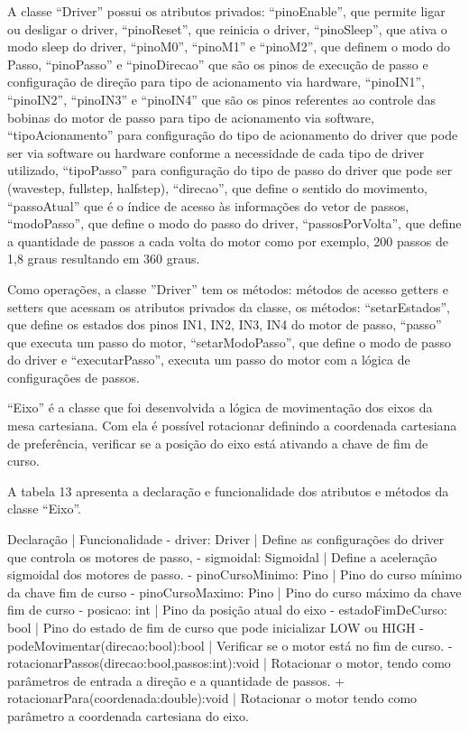 A classe “Driver” possui os atributos privados: “pinoEnable”, que permite ligar ou desligar o driver, 
“pinoReset”, que reinicia o driver, “pinoSleep”, que ativa o modo sleep do driver, “pinoM0”, “pinoM1” 
e “pinoM2”, que definem o modo do Passo, “pinoPasso” e “pinoDirecao” que são os pinos de execução de 
passo e configuração de direção para tipo de acionamento via hardware, “pinoIN1”, “pinoIN2”, “pinoIN3” 
e “pinoIN4” que são os pinos referentes ao controle das bobinas do motor de passo para tipo de acionamento 
via software, “tipoAcionamento” para configuração do tipo de acionamento do driver que pode ser via software 
ou hardware conforme a necessidade de cada tipo de driver utilizado, “tipoPasso” para configuração do tipo 
de passo do driver que pode ser (wavestep, fullstep, halfstep), “direcao”, que define o sentido do movimento, 
“passoAtual” que é o índice de acesso às informações do vetor de passos, “modoPasso”, que define o modo do 
passo do driver, “passosPorVolta”, que define a quantidade de passos a cada volta do motor como por exemplo, 
200 passos de 1,8 graus resultando em 360 graus. 

Como operações, a classe ”Driver” tem os métodos: métodos de acesso getters e setters que acessam os 
atributos privados da classe, os métodos: “setarEstados”, que define os estados dos pinos IN1, IN2, IN3, 
IN4 do motor de passo, “passo” que executa um passo do motor, “setarModoPasso”, que define o modo de passo 
do driver e “executarPasso”, executa um passo do motor com a lógica de configurações de passos.

“Eixo” é a classe que foi desenvolvida a lógica de movimentação dos eixos da mesa cartesiana. Com ela é 
possível rotacionar definindo a coordenada cartesiana de preferência, verificar se a posição do eixo 
está ativando a chave de fim de curso.

A tabela 13 apresenta a declaração e funcionalidade dos atributos e métodos da classe “Eixo”.


Declaração | Funcionalidade
- driver: Driver | Define as configurações do driver que controla os motores de passo,
- sigmoidal: Sigmoidal | Define a aceleração sigmoidal dos motores de passo.
- pinoCursoMinimo: Pino | Pino do curso mínimo da chave fim de curso
- pinoCursoMaximo: Pino | Pino do curso máximo da chave fim de curso
- posicao: int | Pino da posição atual do eixo
- estadoFimDeCurso: bool | Pino do estado de fim de curso que pode inicializar LOW ou HIGH
- podeMovimentar(direcao:bool):bool | Verificar se o motor está no fim de curso.
- rotacionarPassos(direcao:bool,passos:int):void | Rotacionar o motor, tendo como parâmetros de entrada a direção e a quantidade de passos.
+ rotacionarPara(coordenada:double):void | Rotacionar o motor tendo como parâmetro a coordenada cartesiana do eixo.

